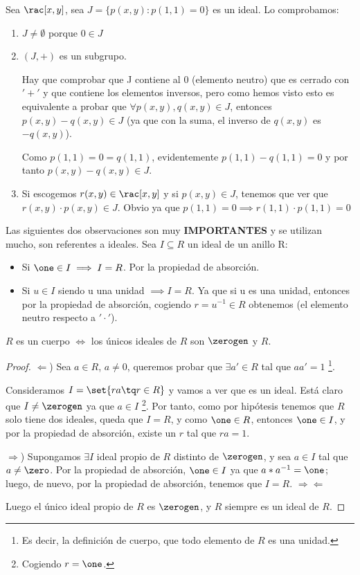 \begin{example} Sea $\rac[x,y]$, sea $J=\{p(x,y): p(1,1)=0\}$ es un ideal. Lo comprobamos:
\begin{enumerate}
	\item $J \neq \emptyset$ porque $0 \in J$
	\item $(J,+)$ es un subgrupo.

	Hay que comprobar que J contiene al 0 (elemento neutro) que es cerrado con $'+'$ y que contiene los elementos inversos, pero como hemos visto esto es equivalente a probar que $\forall p(x,y), q(x,y) \in J$, entonces $p(x,y)-q(x,y) \in J$ (ya que con la suma, el inverso de $q(x,y)$ es $-q(x,y)$).

	Como $p(1,1)=0=q(1,1)$, evidentemente $p(1,1)-q(1,1)=0$ y por tanto $p(x,y)-q(x,y) \in J$.
	\item Si escogemos $r(x,y) \in \rac[x,y]$ y si $p(x,y) \in J$, tenemos que ver que $r(x,y)\cdot p(x,y) \in J$. Obvio ya que $p(1,1)=0 \implies r(1,1)\cdot p(1,1) = 0$
\end{enumerate}
\end{example}

Las siguientes dos observaciones son muy \textbf{IMPORTANTES} y se utilizan mucho, son referentes a ideales. Sea $I \subseteq R$ un ideal de un anillo R:
\begin{itemize}
	\item Si $\one \in I \implies I=R$. Por la propiedad de absorción.
	\item Si $u\in I$ siendo u una unidad $\implies I=R$. Ya que si u es una unidad, entonces por la propiedad de absorción, cogiendo $r=u^{-1} \in R$ obtenemos \one (el elemento neutro respecto a $'\cdot'$).
\end{itemize}
\begin{prop}
	$R$ es un cuerpo $\iff$ los únicos ideales de $R$ son $\zerogen$ y $R$.
\end{prop}
\begin{proof}

	$\Leftarrow$) Sea $a \in R$, $a \neq 0$, queremos probar que $\exists a' \in R$ tal que $aa' = 1$ \footnote{Es decir, la definición de cuerpo, que todo elemento de $R$ es una unidad.}.

	Consideramos $I=\set{ra \tq r \in R}$ y vamos a ver que es un ideal. Está claro que $I \neq \zerogen$ ya que $a \in I$ \footnote{Cogiendo $r = \one$.}. Por tanto, como por hipótesis tenemos que $R$ solo tiene dos ideales, queda que $I=R$, y como $\one \in R$, entonces $\one \in I$, y por la propiedad de absorción, existe un $r$ tal que $ra=1$.

	$\Rightarrow$) Supongamos $\exists I$ ideal propio de $R$ distinto de $\zerogen$, y sea $a \in I$ tal que $a \neq \zero$. Por la propiedad de absorción, $\one \in I$ ya que $a*a^{-1} = \one$; luego, de nuevo, por la propiedad de absorción, tenemos que $I = R$. $\Rightarrow\Leftarrow$

	Luego el único ideal propio de $R$ es $\zerogen$, y $R$ siempre es un ideal de $R$.
\end{proof}

